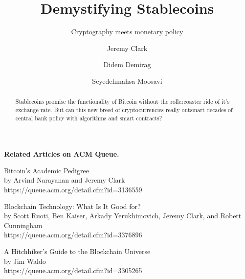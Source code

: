 \documentclass[acmlarge,screen]{acmart}
\begin{document}
\title{Demystifying Stablecoins}
\subtitle{Cryptography meets monetary policy}

\author{Jeremy Clark}

\author{Didem Demirag}

\author{Seyedehmahsa Moosavi}

\begin{abstract} Stablecoins promise the functionality of Bitcoin without the rollercoaster ride of it's exchange rate. But can this new breed of cryptocurrencies really outsmart decades of central bank policy with algorithms and smart contracts?\end{abstract}

\maketitle









% 

\begin{Sidebar*}[h!]
\begin{framed}
\begin{flushleft}
\textbf{Related Articles on ACM Queue.} \newline

Bitcoin’s Academic Pedigree \\
by Arvind Narayanan and Jeremy Clark \\
https://queue.acm.org/detail.cfm?id=3136559 \newline

Blockchain Technology: What Is It Good for? \\ 
by Scott Ruoti, Ben Kaiser, Arkady Yerukhimovich, Jeremy Clark, and Robert Cunningham \\
https://queue.acm.org/detail.cfm?id=3376896 \newline

A Hitchhiker’s Guide to the Blockchain Universe\\
by Jim Waldo \\
https://queue.acm.org/detail.cfm?id=3305265
\end{flushleft}
\end{framed}
\end{Sidebar*}

\end{document}
